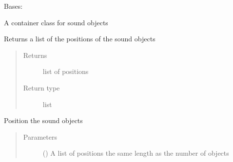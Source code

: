 \documentclass[letterpaper,10pt,english]{sphinxmanual}
\begin{document}
\begin{fulllineitems}
\label{\detokenize{source/pyzones:pyzones.SoundObjectArray}}
Bases: 

A container class for sound objects

\begin{fulllineitems}
\label{\detokenize{source/pyzones:pyzones.SoundObjectArray.get_object_positions}}
Returns a list of the positions of the sound objects
\begin{quote}\begin{description}
\item[{Returns}] \leavevmode
list of positions

\item[{Return type}] \leavevmode
list

\end{description}\end{quote}

\end{fulllineitems}


\begin{fulllineitems}
\label{\detokenize{source/pyzones:pyzones.SoundObjectArray.position_objects}}
Position the sound objects
\begin{quote}\begin{description}
\item[{Parameters}] \leavevmode
{} () \textendash{} A list of positions the same length as the number of objects

\end{description}\end{quote}

\end{fulllineitems}


\end{fulllineitems}
\end{document}
